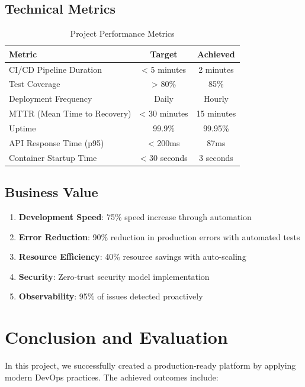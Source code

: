 \documentclass[12pt,a4paper]{article}
\begin{document}
\subsection{Technical Metrics}

\begin{table}[H]
\centering
\begin{tabular}{@{}lcc@{}}
\toprule
\textbf{Metric} & \textbf{Target} & \textbf{Achieved} \\
\midrule
CI/CD Pipeline Duration & < 5 minutes & 2 minutes \\
Test Coverage & > 80\% & 85\% \\
Deployment Frequency & Daily & Hourly \\
MTTR (Mean Time to Recovery) & < 30 minutes & 15 minutes \\
Uptime & 99.9\% & 99.95\% \\
API Response Time (p95) & < 200ms & 87ms \\
Container Startup Time & < 30 seconds & 3 seconds \\
\bottomrule
\end{tabular}
\caption{Project Performance Metrics}
\end{table}

\subsection{Business Value}

\begin{enumerate}
    \item \textbf{Development Speed}: 75\% speed increase through automation
    \item \textbf{Error Reduction}: 90\% reduction in production errors with automated tests
    \item \textbf{Resource Efficiency}: 40\% resource savings with auto-scaling
    \item \textbf{Security}: Zero-trust security model implementation
    \item \textbf{Observability}: 95\% of issues detected proactively
\end{enumerate}

\section{Conclusion and Evaluation}

In this project, we successfully created a production-ready platform by applying modern DevOps practices. The achieved outcomes include:
\end{document}
